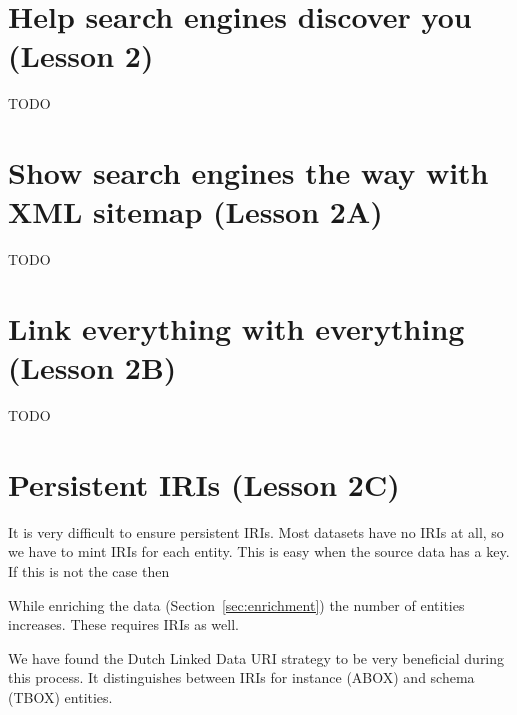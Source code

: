 \documentclass[a4paper]{scrartcl}
\begin{document}
\section{Help search engines discover you (Lesson 2)}

TODO


\section{Show search engines the way with XML sitemap (Lesson 2A)}

TODO


\section{Link everything with everything (Lesson 2B)}

TODO


\section{Persistent IRIs (Lesson 2C)}
\label{sec:persistent_iris}

It is very difficult to ensure persistent IRIs.  Most datasets have no
IRIs at all, so we have to mint IRIs for each entity.  This is easy
when the source data has a key.  If this is not the case then 

While enriching
the data (Section~\ref{sec:enrichment}) the number of entities
increases.  These requires IRIs as well.

We have found the Dutch Linked Data URI strategy to be very beneficial
during this process.  It distinguishes between IRIs for instance
(ABOX) and schema (TBOX) entities.

\end{document}
